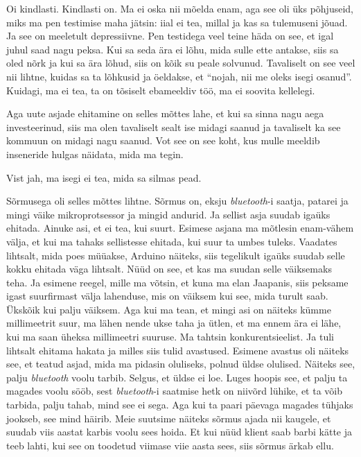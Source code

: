 
Oi kindlasti. Kindlasti on. Ma ei oska nii mõelda enam, aga see oli üks põhjuseid, miks ma pen testimise maha jätsin: iial ei tea, millal ja kas sa  tulemuseni jõuad. Ja see on meeletult depressiivne. Pen testidega veel teine häda on see, et igal juhul saad nagu peksa. Kui sa seda ära ei lõhu, mida sulle ette antakse, siis sa oled nõrk ja kui sa  ära lõhud, siis on kõik su peale solvunud. Tavaliselt on see veel nii lihtne, kuidas sa ta  lõhkusid ja öeldakse, et \enquote{nojah, nii me oleks isegi osanud}. Kuidagi, ma ei tea, ta on tõsiselt ebameeldiv töö, ma ei soovita kellelegi. 

Aga uute asjade ehitamine on selles mõttes lahe, et kui sa sinna nagu aega investeerinud, siis ma olen tavaliselt sealt ise midagi saanud ja tavaliselt ka see kommuun on midagi nagu saanud. Vot see on see koht, kus mulle meeldib inseneride hulgas näidata, mida ma tegin. 


Vist jah, ma isegi ei tea, mida sa silmas pead. 


Sõrmusega oli selles mõttes lihtne. Sõrmus on, eksju \emph{bluetooth}-i saatja, patarei ja mingi väike mikroprotsessor ja mingid andurid. Ja sellist asja suudab igaüks ehitada. Ainuke asi, et ei tea, kui suurt. Esimese asjana ma mõtlesin enam-vähem välja, et kui ma tahaks sellistesse ehitada, kui suur ta umbes tuleks. Vaadates lihtsalt, mida poes müüakse, Arduino näiteks, siis tegelikult igaüks suudab selle kokku ehitada väga lihtsalt. Nüüd on see, et kas ma suudan selle väiksemaks teha. Ja esimene reegel, mille ma võtsin, et kuna ma elan Jaapanis, siis peksame igast suurfirmast välja lahenduse, mis on väiksem kui see, mida turult saab. Ükskõik kui palju väiksem. Aga kui ma tean, et mingi asi on näiteks kümme millimeetrit suur, ma lähen nende ukse taha ja ütlen, et ma ennem ära ei lähe, kui ma saan üheksa millimeetri suuruse. Ma tahtsin konkurentsieelist. Ja tuli lihtsalt ehitama hakata ja milles siis tulid avastused. Esimene avastus oli näiteks see, et teatud asjad, mida ma pidasin oluliseks, polnud üldse olulised. Näiteks see, palju \emph{bluetooth} voolu tarbib. Selgus, et üldse ei loe. Luges hoopis see, et palju ta magades voolu sööb, sest \emph{bluetooth}-i saatmise hetk on niivõrd lühike, et ta võib tarbida, palju tahab, mind see ei sega. Aga kui ta paari päevaga magades tühjaks jookseb, see mind häirib. Meie suutsime näiteks sõrmus ajada nii kaugele, et suudab viis aastat karbis voolu sees hoida. Et kui nüüd klient saab barbi kätte ja teeb lahti, kui see on toodetud viimase viie aasta sees, siis sõrmus ärkab ellu. 

